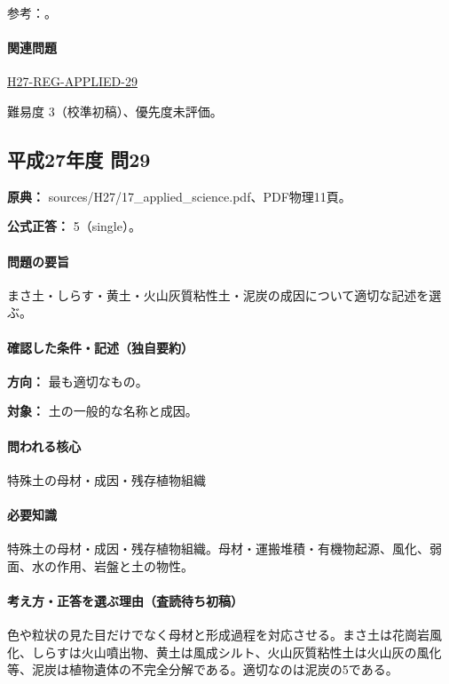 \par 参考：\cite{mlit_masa,maff_shiras2017,mlit_peat,gsj_loess2002}。

\paragraph{関連問題} \hyperref[q:h27-reg-applied-29]{H27-REG-APPLIED-29}

\par 難易度 3（校準初稿）、優先度未評価。

\subsection{平成27年度 問29}
\label{q:h27-reg-applied-29}

\noindent\textbf{原典：} sources/H27/17\_applied\_science.pdf、PDF物理11頁。

\textbf{公式正答：} 5（single）。

\paragraph{問題の要旨} まさ土・しらす・黄土・火山灰質粘性土・泥炭の成因について適切な記述を選ぶ。

\paragraph{確認した条件・記述（独自要約）}\mbox{}\par

\noindent\textbf{方向：} 最も適切なもの。\par

\noindent\textbf{対象：} 土の一般的な名称と成因。\par

\paragraph{問われる核心} 特殊土の母材・成因・残存植物組織

\paragraph{必要知識} 特殊土の母材・成因・残存植物組織。母材・運搬堆積・有機物起源、風化、弱面、水の作用、岩盤と土の物性。

\paragraph{考え方・正答を選ぶ理由（査読待ち初稿）} 色や粒状の見た目だけでなく母材と形成過程を対応させる。まさ土は花崗岩風化、しらすは火山噴出物、黄土は風成シルト、火山灰質粘性土は火山灰の風化等、泥炭は植物遺体の不完全分解である。適切なのは泥炭の5である。

